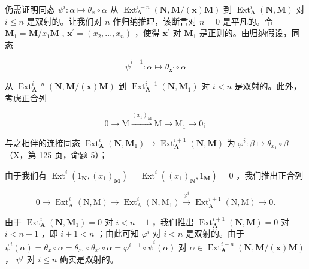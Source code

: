 仍需证明同态 \(\psi^{i}:\alpha\mapsto\theta_{x}\circ\alpha\) 从 \(\operatorname{Ext}_{\mathbf{A}}^{i-n}(\mathbf{N},\mathbf{M}/(\mathbf{x})\mathbf{M})\) 到 \(\operatorname{Ext}_{\mathbf{A}}^{i}(\mathbf{N},\mathbf{M})\) 对 \(i\leqslant n\) 是双射的。让我们对 \(n\) 作归纳推理，该断言对 \(n=0\) 是平凡的。令 \(\mathbf{M}_{1}=\mathbf{M}/x_{1}\mathbf{M}\) , \(\mathbf{x}^{\prime}=(x_{2},...,x_{n})\) ，使得 \(\mathbf{x}^{\prime}\) 对 \(\mathbf{M}_{1}\) 是正则的。由归纳假设，同态

\[
\overline {{{{\psi}}}} ^ {i - 1}: \alpha \mapsto \theta_ {\boldsymbol {x} ^ {\prime}} \circ \alpha
\]

从 \(\operatorname{Ext}_{\mathbf{A}}^{i-n}(\mathbf{N}, \mathbf{M}/(\mathbf{x})\mathbf{M})\) 到 \(\operatorname{Ext}_{\mathbf{A}}^{i-1}(\mathbf{N}, \mathbf{M}_1)\) 对 \(i < n\) 是双射的。此外，考虑正合列

\[
0 \longrightarrow \mathrm{M} \xrightarrow {(x _ {1}) _ {\mathrm{M}}} \mathrm{M} \longrightarrow \mathrm{M} _ {1} \longrightarrow 0;
\]

与之相伴的连接同态 \(\operatorname{Ext}_{\mathbf{A}}^{i}(\mathbf{N}, \mathbf{M}_{1}) \to \operatorname{Ext}_{\mathbf{A}}^{i+1}(\mathbf{N}, \mathbf{M})\) 为 \(\varphi^{i}: \beta \mapsto \theta_{x_{1}} \circ \beta\) （X，第 125 页，命题 5）；

由于我们有 \(\operatorname{Ext}^i(1_{\mathbf{N}}, (x_1)_{\mathbf{M}}) = \operatorname{Ext}^i((x_1)_{\mathbf{N}}, 1_{\mathbf{M}}) = 0\) ，我们推出正合列

\[
0 \longrightarrow \operatorname{Ext} _ {\mathrm{A}} ^ {i} (\mathrm{N}, \mathrm{M}) \longrightarrow \operatorname{Ext} _ {\mathrm{A}} ^ {i} (\mathrm{N}, \mathrm{M} _ {1}) \xrightarrow {\varphi^ {i}} \operatorname{Ext} _ {\mathrm{A}} ^ {i + 1} (\mathrm{N}, \mathrm{M}) \longrightarrow 0.
\]

由于 \(\operatorname{Ext}_{\mathbf{A}}^{i}(\mathbf{N}, \mathbf{M}_{1}) = 0\) 对 \(i < n - 1\) ，我们推出 \(\operatorname{Ext}_{\mathbf{A}}^{i + 1}(\mathbf{N}, \mathbf{M}) = 0\) 对 \(i < n - 1\) ，即 \(i + 1 < n\) ；由此可知 \(\varphi^{i}\) 对 \(i < n\) 是双射的。由于 \(\psi^{i}(\alpha) = \theta_{x} \circ \alpha = \theta_{x_{1}} \circ \theta_{x'} \circ \alpha = \varphi^{i - 1} \circ \overline{\psi}^{i}(\alpha)\) 对 \(\alpha \in \operatorname{Ext}_{\mathbf{A}}^{i - n}(\mathbf{N}, \mathbf{M}/(\mathbf{x})\mathbf{M})\) ， \(\psi^{i}\) 对 \(i \leqslant n\) 确实是双射的。

\backmatter
{}
